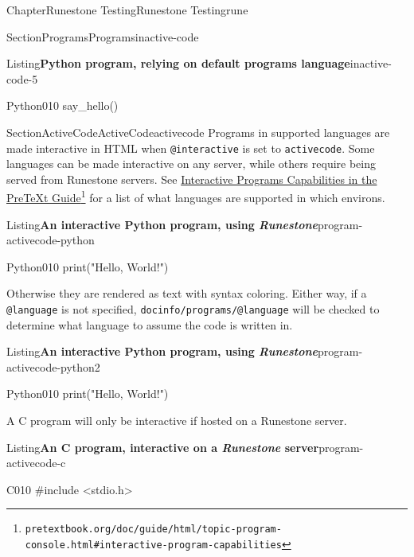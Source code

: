 \documentclass[oneside,10pt,]{book}
\newcommand{\mono}[1]{\texttt{#1}}
\newcommand{\pubtitle}[1]{\textsl{#1}}
\numberwithin{equation}{section}
\begin{document}
\begin{chapterptx}{Chapter}{Runestone Testing}{}{Runestone Testing}{}{}{rune}
\begin{sectionptx}{Section}{Programs}{}{Programs}{}{}{inactive-code}
\begin{listingptx}{Listing}{\textbf{Python program, relying on default programs language}}{inactive-code-5}{}
\begin{programnumbered}{Python}{0}{1}{0}
say_hello()
\end{programnumbered}
\end{listingptx}%
\end{sectionptx}
%
%
\typeout{************************************************}
\typeout{************************************************}
%
\begin{sectionptx}{Section}{ActiveCode}{}{ActiveCode}{}{}{activecode}
Programs in supported languages are made interactive in HTML when \mono{@interactive} is set to \mono{activecode}. Some languages can be made interactive on any server, while others require being served from Runestone servers. See \href{https://pretextbook.org/doc/guide/html/topic-program-console.html\#interactive-program-capabilities}{Interactive Programs Capabilities in the PreTeXt Guide}\footnote{\nolinkurl{pretextbook.org/doc/guide/html/topic-program-console.html\#interactive-program-capabilities}\label{activecode-2-4}} for a list of what languages are supported in which environs.%
\begin{listingptx}{Listing}{\textbf{An interactive Python program, using \pubtitle{Runestone}}}{program-activecode-python}{}%
\begin{program}{Python}{0}{1}{0}
print("Hello, World!")
\end{program}
\end{listingptx}%
Otherwise they are rendered as text with syntax coloring. Either way, if a \mono{@language} is not specified, \mono{docinfo/programs/@language} will be checked to determine what language to assume the code is written in.%
\begin{listingptx}{Listing}{\textbf{An interactive Python program, using \pubtitle{Runestone}}}{program-activecode-python2}{}%
\begin{program}{Python}{0}{1}{0}
print("Hello, World!")
\end{program}
\end{listingptx}%
A C program will only be interactive if hosted on a Runestone server.%
\begin{listingptx}{Listing}{\textbf{An C program, interactive on a \pubtitle{Runestone} server}}{program-activecode-c}{}%
\begin{program}{C}{0}{1}{0}
#include <stdio.h>


\end{program}
\end{listingptx}
\end{sectionptx}
\end{chapterptx}
\end{document}

